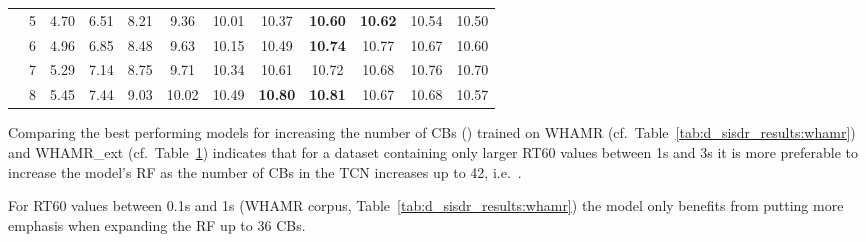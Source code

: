 \documentclass[conference,a4paper]{IEEEtran}
\begin{document}
\begin{table}[!ht]
\begin{tabular}{cc|cccccccccc|}
\multicolumn{1}{|c}{\cellcolor[HTML]{C0C0C0}}& \multicolumn{1}{|c|}{\cellcolor[HTML]{C0C0C0}5} & 4.70  & 6.51 & 8.21 & 9.36  & 10.01 & 10.37 & \bfseries 10.60  & \bfseries 10.62 & 10.54 & 10.50  \\
\multicolumn{1}{|c}{\cellcolor[HTML]{C0C0C0}}& \multicolumn{1}{|c|}{\cellcolor[HTML]{C0C0C0}6} & 4.96 & 6.85 & 8.48 & 9.63  & 10.15 & 10.49 & \bfseries 10.74 & 10.77 & 10.67 & 10.60  \\
\multicolumn{1}{|c}{\cellcolor[HTML]{C0C0C0}}& \multicolumn{1}{|c|}{\cellcolor[HTML]{C0C0C0}7} & 5.29 & 7.14 & 8.75 & 9.71  & 10.34 & 10.61 & 10.72 & 10.68 & 10.76 & 10.70  \\
\multicolumn{1}{|c}{\multirow{-8}{*}{\cellcolor[HTML]{C0C0C0}}} & \multicolumn{1}{|c|}{\cellcolor[HTML]{C0C0C0}8} & 5.45 & 7.44 & 9.03 & 10.02 & 10.49 & \bfseries 10.80  & \bfseries 10.81 & 10.67 & 10.68 & 10.57 \\ \hline
\end{tabular}
\label{tab:d_sisdr_results:whamr_ext}
\end{table}

Comparing the best performing models for increasing the number of \acp{CB} () trained on WHAMR ({cf.~}Table~\ref{tab:d_sisdr_results:whamr}) and WHAMR\_ext ({cf.~}Table~\ref{tab:d_sisdr_results:whamr_ext}) indicates that for {a dataset containing} only larger RT60 values between 1s and 3s it is more preferable to increase the model's \ac{RF} as the number of \acp{CB} in the \ac{TCN} increases up to 42{, i.e.~}. 

For RT60 values between 0.1s and 1s {(WHAMR corpus, Table~\ref{tab:d_sisdr_results:whamr})} the model only benefits from putting more emphasis when expanding the \ac{RF} up to 36 \acp{CB}. 
\end{document}
